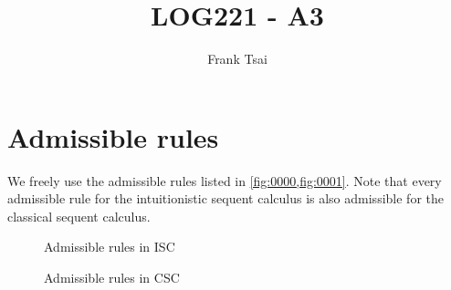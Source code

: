 \documentclass[a4paper]{article}
\title{LOG221 - A3}
\author{Frank Tsai}
\begin{document}
\maketitle

\section*{Admissible rules}

We freely use the admissible rules listed in \cref{fig:0000,fig:0001}.
Note that every admissible rule for the intuitionistic sequent calculus is also admissible for the classical sequent calculus.

\begin{figure}[h]
  \centering

  \caption{Admissible rules in ISC}
  \label{fig:0000}
\end{figure}
\begin{figure}[h]
  \centering
  \caption{Admissible rules in CSC}
  \label{fig:0001}
\end{figure}
\end{document}
